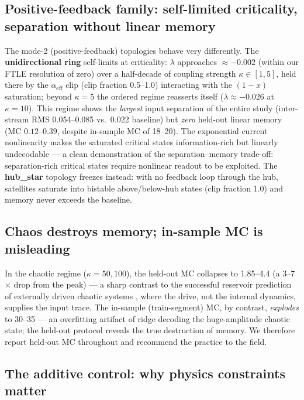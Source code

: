 \documentclass[11pt]{article}
\begin{document}
\subsection{Positive-feedback family: self-limited criticality, separation without linear memory}

The mode-2 (positive-feedback) topologies behave very differently. The
\textbf{unidirectional ring} self-limits at criticality: $\lambda$ approaches
$\approx -0.002$ (within our FTLE resolution of zero) over a half-decade of
coupling strength $\kappa\in[1,5]$, held there by the $\alpha_{\mathrm{eff}}$
clip (clip fraction 0.5--1.0) interacting with the $(1-x)$ saturation;
beyond $\kappa=5$ the ordered regime reasserts itself
($\lambda\approx-0.026$ at $\kappa=10$). This
regime shows the \emph{largest} input separation of the entire study
(inter-stream RMS 0.054--0.085 vs.\ 0.022 baseline) but \emph{zero} held-out
linear memory (MC $0.12$--$0.39$, despite in-sample MC of 18--20). The
exponential current nonlinearity makes the saturated critical states
information-rich but linearly undecodable --- a clean demonstration of the
separation--memory trade-off: separation-rich critical states require nonlinear
readout to be exploited. The \textbf{hub\_star} topology freezes instead:
with no feedback loop through the hub, satellites saturate into bistable
above/below-hub states (clip fraction 1.0) and memory never exceeds the
baseline.

\subsection{Chaos destroys memory; in-sample MC is misleading}
\label{sec:chaos}

In the chaotic regime ($\kappa=50,100$), the held-out MC collapses to 1.85--4.4
(a 3--7$\times$ drop from the peak) --- a sharp contrast to the successful
reservoir prediction of externally driven chaotic systems \cite{jaeger2004,
pathak2018},
where the drive, not the internal dynamics, supplies the input trace. The in-sample (train-segment) MC, by
contrast, \emph{explodes} to 30--35 --- an overfitting artifact of ridge
decoding the huge-amplitude chaotic state; the held-out protocol reveals the
true destruction of memory. We therefore report held-out MC throughout and
recommend the practice to the field.

\subsection{The additive control: why physics constraints matter}
\end{document}
